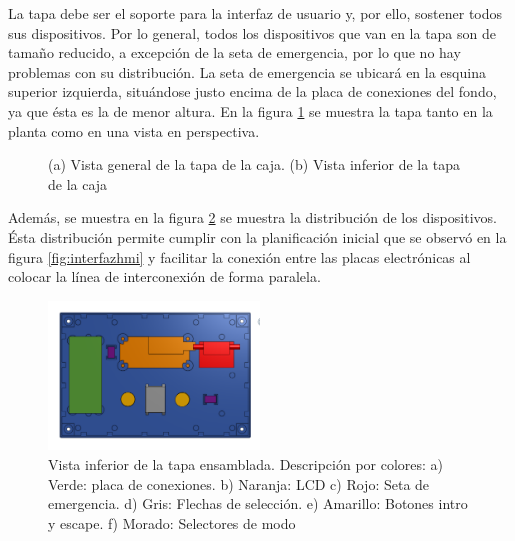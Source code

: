 La tapa debe ser el soporte para la interfaz de usuario y, por ello, sostener todos sus 
dispositivos. Por lo general, todos los dispositivos que van en la tapa son de tamaño reducido,
a excepción de la seta de emergencia, por lo que no hay problemas con su distribución. La seta
de emergencia se ubicará en la esquina superior izquierda, situándose justo encima de la placa
de conexiones del fondo, ya que ésta es la de menor altura. En la figura \ref{fig:cajatapa} se 
muestra la tapa tanto en la planta como en una vista en perspectiva.

\begin{figure}[h]%
    \centering 
    \hspace{10pt}%
    \caption{(a) Vista general de la tapa de la caja. (b) Vista inferior de la tapa de la caja}
    \label{fig:cajatapa} 
\end{figure} 

Además, se muestra en la figura \ref{fig:cajatapaensamblaje} se muestra la distribución de los 
dispositivos. Ésta distribución permite cumplir con la planificación inicial que se observó en 
la figura \ref{fig:interfazhmi} y facilitar la conexión entre las placas electrónicas al colocar
la línea de interconexión de forma paralela.

\begin{figure}[h]%
    \centering 
        \includegraphics[width=0.5\textwidth]{04-caja/ensamblajetapainferior.png}
    \caption{Vista inferior de la tapa ensamblada. Descripción por colores: a) Verde: placa de 
    conexiones. b) Naranja: LCD c) Rojo: Seta de emergencia. d) Gris: Flechas de selección.
    e) Amarillo: Botones intro y escape. f) Morado: Selectores de modo}
    \label{fig:cajatapaensamblaje} 
\end{figure}